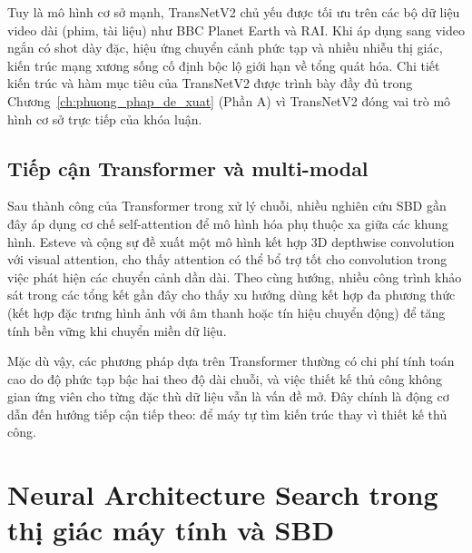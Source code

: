 Tuy là mô hình cơ sở mạnh, TransNetV2 chủ yếu được tối ưu trên các bộ dữ liệu video dài (phim, tài liệu) như BBC Planet Earth và RAI. Khi áp dụng sang video ngắn có shot dày đặc, hiệu ứng chuyển cảnh phức tạp và nhiều nhiễu thị giác, kiến trúc mạng xương sống cố định bộc lộ giới hạn về tổng quát hóa. Chi tiết kiến trúc và hàm mục tiêu của TransNetV2 được trình bày đầy đủ trong Chương~\ref{ch:phuong_phap_de_xuat} (Phần A) vì TransNetV2 đóng vai trò mô hình cơ sở trực tiếp của khóa luận.

\subsection{Tiếp cận Transformer và multi-modal}
Sau thành công của Transformer \cite{vaswani2017attention} trong xử lý chuỗi, nhiều nghiên cứu SBD gần đây áp dụng cơ chế self-attention để mô hình hóa phụ thuộc xa giữa các khung hình. Esteve và cộng sự \cite{esteve2023shot} đề xuất một mô hình kết hợp 3D depthwise convolution với visual attention, cho thấy attention có thể bổ trợ tốt cho convolution trong việc phát hiện các chuyển cảnh dần dài. Theo cùng hướng, nhiều công trình khảo sát trong các tổng kết gần đây \cite{Kar2024_VideoSBD_IssuesChallengesSolutions} cho thấy xu hướng dùng kết hợp đa phương thức (kết hợp đặc trưng hình ảnh với âm thanh hoặc tín hiệu chuyển động) để tăng tính bền vững khi chuyển miền dữ liệu.

Mặc dù vậy, các phương pháp dựa trên Transformer thường có chi phí tính toán cao do độ phức tạp bậc hai theo độ dài chuỗi, và việc thiết kế thủ công không gian ứng viên cho từng đặc thù dữ liệu vẫn là vấn đề mở. Đây chính là động cơ dẫn đến hướng tiếp cận tiếp theo: để máy tự tìm kiến trúc thay vì thiết kế thủ công.

\section{Neural Architecture Search trong thị giác máy tính và SBD}
\label{sec:nas_for_sbd}


